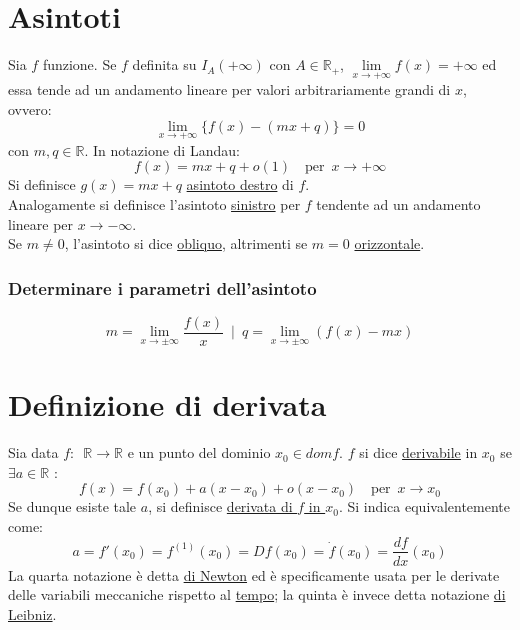 \documentclass[10pt, oneside]{book}
\theoremstyle{plain}
\begin{document}
\section{Asintoti}
\begin{defin}
Sia $f$ funzione. 
Se $f$ definita su $I_A(+ \infty)$ con $A \in \mathbb{R}_+$, $\lim \limits_{x \rightarrow + \infty} f(x) = + \infty$ ed essa tende ad un andamento lineare per valori arbitrariamente grandi di $x$, ovvero:
\[\lim \limits_{x \rightarrow + \infty} \{f(x) - (mx + q)\} = 0\]
con $m, q \in \mathbb{R}$. In notazione di Landau:
\[f(x) = mx +q + o(1) \quad \textrm{per} \enspace x \rightarrow + \infty\]
Si definisce $g(x) = mx + q$ \underline{asintoto destro} di $f$.\\ Analogamente si definisce l'asintoto \underline{sinistro} per $f$ tendente ad un andamento lineare per $x \rightarrow - \infty$.\\
Se $m \neq 0$, l'asintoto si dice \underline{obliquo}, altrimenti se $m = 0$ \underline{orizzontale}. 
\end{defin}

\subsubsection*{Determinare i parametri dell'asintoto}
\[m = \lim \limits_{x \rightarrow \pm \infty} \frac{f(x)}{x} \enspace | \enspace q = \lim \limits_{x \rightarrow \pm \infty} (f(x) - mx)\]

\section{Definizione di derivata}
\begin{defin} Sia data $f : \enspace \mathbb{R} \rightarrow \mathbb{R}$ e un punto del dominio $x_0 \in dom f$. $f$ si dice \underline{derivabile} in $x_0$ se $\exists a \in \mathbb{R}$ :
\[f(x) = f(x_0) + a(x-x_0) + o(x-x_0) \quad \textrm{per} \enspace x \rightarrow x_0\]
Se dunque esiste tale $a$, si definisce \underline{derivata di $f$ in $x_0$}. Si indica equivalentemente come:
\[a = f'(x_0) = f^{(1)}(x_0) = Df(x_0) = \dot{f}(x_0) = \frac{df}{dx}(x_0)\]
La quarta notazione è detta \underline{di Newton} ed è specificamente usata per le derivate delle variabili meccaniche rispetto al \underline{tempo}; la quinta è invece detta notazione \underline{di Leibniz}.
\end{defin}
\end{document}
